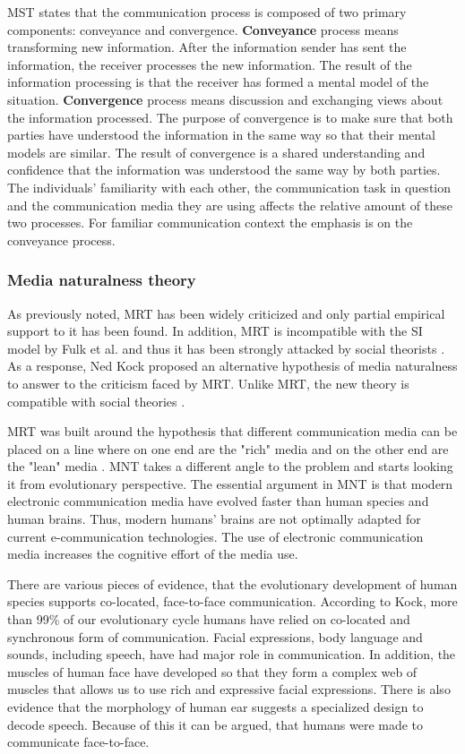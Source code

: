 \documentclass[english,12pt,a4paper,pdftex]{article}
\begin{document}
\ac{MST} states that the communication process is composed of two primary components: conveyance and convergence. \textbf{Conveyance} process means transforming new information. After the information sender has sent the information, the receiver processes the new information. The result of the information processing is that the receiver has formed a mental model of the situation. \textbf{Convergence} process means discussion and exchanging views about the information processed. The purpose of convergence is to make sure that both parties have understood the information in the same way so that their mental models are similar. The result of convergence is a shared understanding and confidence that the information was understood the same way by both parties. The individuals' familiarity with each other, the communication task in question and the communication media they are using affects the relative amount of these two processes. For familiar communication context the emphasis is on the conveyance process. \citep{dennis2008}

\subsubsection{Media naturalness theory}

As previously noted, \ac{MRT} has been widely criticized and only partial empirical support to it has been found. In addition, \ac{MRT} is incompatible with the \ac{SI} model by Fulk et al. \citep{fulk1987} \citep{schmitz1991} and thus it has been strongly attacked by social theorists \citep{kock2005}. As a response, Ned Kock proposed an alternative hypothesis of media naturalness to answer to the criticism faced by \ac{MRT}. Unlike \ac{MRT}, the new theory is compatible with social theories \citep{kock2005}.

\ac{MRT} was built around the hypothesis that different communication media can be placed on a line where on one end are the "rich" media and on the other end are the "lean" media \citep{daft1986}. \Ac{MNT} takes a different angle to the problem and starts looking it from evolutionary perspective. The essential argument in \ac{MNT} is that modern electronic communication media have evolved faster than human species and human brains. Thus, modern humans' brains are not optimally adapted for current e-communication technologies. The use of electronic communication media increases the cognitive effort of the media use. \citep{kock2005}

There are various pieces of evidence, that the evolutionary development of human species supports co-located, face-to-face communication. According to Kock, more than 99\% of our evolutionary cycle humans have relied on co-located and synchronous form of communication. Facial expressions, body language and sounds, including speech, have had major role in communication. In addition, the muscles of human face have developed so that they form a complex web of muscles that allows us to use rich and expressive facial expressions. There is also evidence that the morphology of human ear suggests a specialized design to decode speech. Because of this it can be argued, that humans were made to communicate face-to-face. \citep{kock2005}
\end{document}
